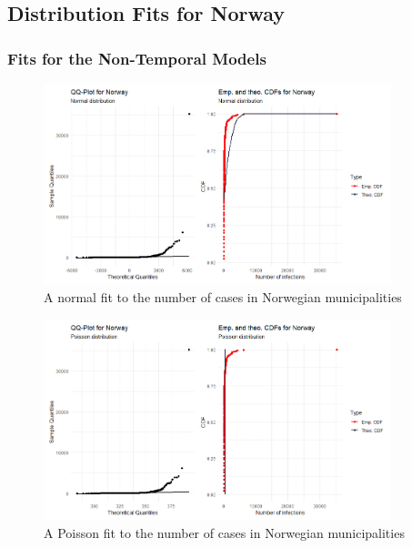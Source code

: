 \subsection{Distribution Fits for Norway}
\subsubsection{Fits for the Non-Temporal Models}\label{sec:temp_fit_norway}
\begin{figure}[H]
    \centering
    \includegraphics[width = 0.9\textwidth]{fit_normal_norway.png}
    \caption{A normal fit to the number of cases in Norwegian municipalities}
    \label{fitNormalNorway}
\end{figure}
\clearpage
\begin{figure}[H]
    \centering
    \includegraphics[width = 0.9\textwidth]{fit_poisson_norway.png}
    \caption{A Poisson fit to the number of cases in Norwegian municipalities}
    \label{fitPoissonNorway}
\end{figure}
